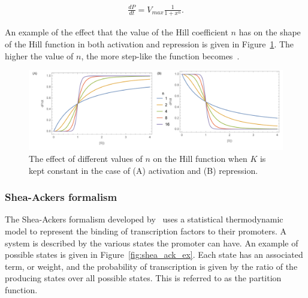 \begin{align*}
	\frac{dP}{dt} = V_{max}\frac{1}{1 + x^n}.
\end{align*}



\noindent An example of the effect that the value of the Hill coefficient $n$ has on the shape of the Hill function in both activation and repression is given in Figure~\ref{fig:hill_ex}. The higher the value of $n$, the more step-like the function becomes~\autocite{Alon:2007}. 
\newpage

\begin{figure}[htb]
\centerfloat
    \includegraphics[scale=0.6]{../../chapters/chapterBackgr/images/hill_both-01.png}
    \caption[Hill formalism example]{The effect of different values of $n$ on the Hill function when $K$ is kept constant in the case of (A) activation and (B) repression.}
    \label{fig:hill_ex}
\end{figure}



\subsubsection{Shea-Ackers formalism}
\label{sec:shea-ackers}
The Shea-Ackers formalism developed by~\textcite{Ackers:1982tq} uses a statistical thermodynamic model to represent the binding of transcription factors to their promoters. A system is described by the various states the promoter can have. An example of possible states is given in Figure~\ref{fig:shea_ack_ex}. Each state has an associated term, or weight, and the probability of transcription is given by the ratio of the producing states over all possible states. This is referred to as the partition function. 

